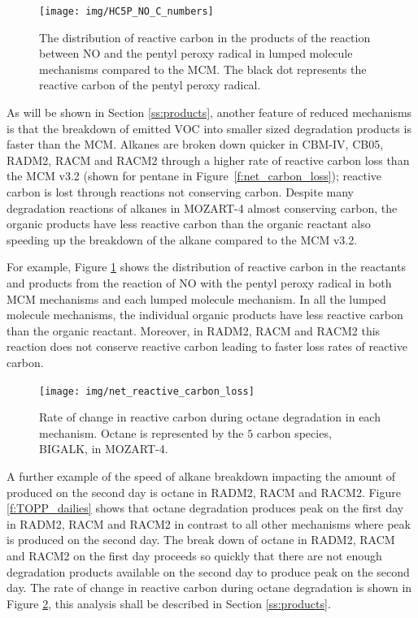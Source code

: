 %
\begin{figure}
    \centering
    \caption{The distribution of reactive carbon in the products of the reaction between NO and the pentyl peroxy radical in lumped molecule mechanisms compared to the MCM. The black dot represents the reactive carbon of the pentyl peroxy radical.}
    \texttt{[image: img/HC5P\_NO\_C\_numbers]}
    \label{f:HC5P_NO}
    \vspace{-2mm}
\end{figure}
%
As will be shown in Section \ref{ss:products}, another feature of reduced mechanisms is that the breakdown of emitted VOC into smaller sized degradation products is faster than the MCM.
Alkanes are broken down quicker in CBM-IV, CB05, RADM2, RACM and RACM2 through a higher rate of reactive carbon loss than the MCM v3.2 (shown for pentane in \mbox{Figure \ref{f:net_carbon_loss}}); reactive carbon is lost through reactions not conserving carbon.
Despite many degradation reactions of alkanes in MOZART-4 almost conserving carbon, the organic products have less reactive carbon than the organic reactant also speeding up the breakdown of the alkane compared to the MCM v3.2.

For example, Figure \ref{f:HC5P_NO} shows the distribution of reactive carbon in the reactants and products from the reaction of NO with the pentyl peroxy radical in both MCM mechanisms and each lumped molecule mechanism.
In all the lumped molecule mechanisms, the individual organic products have less reactive carbon than the organic reactant. 
Moreover, in RADM2, RACM and RACM2 this reaction does not conserve reactive carbon leading to faster loss rates of reactive carbon. 

\begin{figure}
    \centering
    \caption{Rate of change in reactive carbon during octane degradation in each mechanism. Octane is represented by the $5$ carbon species, BIGALK, in MOZART-4.}
    \texttt{[image: img/net\_reactive\_carbon\_loss]}
    \vspace{-2mm}
    \label{f:octane}
\end{figure}
A further example of the speed of alkane breakdown impacting the amount of  produced on the second day is octane in RADM2, RACM and RACM2.
Figure \ref{f:TOPP_dailies} shows that octane degradation produces peak  on the first day in RADM2, RACM and RACM2 in contrast to all other mechanisms where peak  is produced on the second day.
The break down of octane in RADM2, RACM and RACM2 on the first day proceeds so quickly that there are not enough degradation products available on the second day to produce peak  on the second day.
The rate of change in reactive carbon during octane degradation is shown in Figure \ref{f:octane}, this analysis shall be described in Section \ref{ss:products}.

